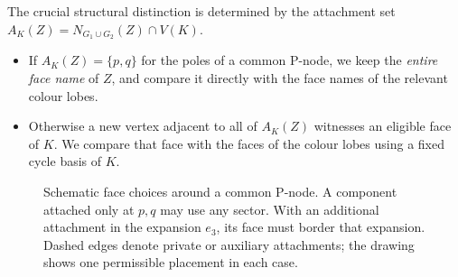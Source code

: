 The crucial structural distinction is determined by the attachment set
$A_K(Z)=N_{G_1\cup G_2}(Z)\cap V(K)$.
\begin{itemize}[leftmargin=1.4em]
\item If $A_K(Z)=\{p,q\}$ for the poles of a common P-node, we keep the
      \emph{entire face name} of $Z$, and compare it directly with the face
      names of the relevant colour lobes.
\item Otherwise a new vertex adjacent to all of $A_K(Z)$ witnesses an
      eligible face of $K$.  We compare that face with the faces of the
      colour lobes using a fixed cycle basis of $K$.
\end{itemize}
\begin{figure}[t]
\centering
{}
\caption{Schematic face choices around a common P-node.  A component
attached only at $p,q$ may use any sector.  With an additional
attachment in the expansion $e_3$, its face must border that expansion.
Dashed edges denote private or auxiliary attachments; the drawing
shows one permissible placement in each case.}
\label{fig:sector-dichotomy}
\end{figure}

